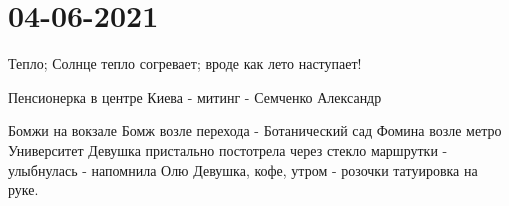  
 
 
 
 
\section{04-06-2021}
\label{sec:kiev.pogoda.04_06_2021}

Тепло; Солнце тепло согревает; вроде как лето наступает!

Пенсионерка в центре Киева - митинг - Семченко Александр

Бомжи на вокзале
Бомж возле перехода - Ботанический сад Фомина возле метро Университет
Девушка пристально постотрела через стекло маршрутки - улыбнулась - напомнила Олю
Девушка, кофе, утром - розочки татуировка на руке.


